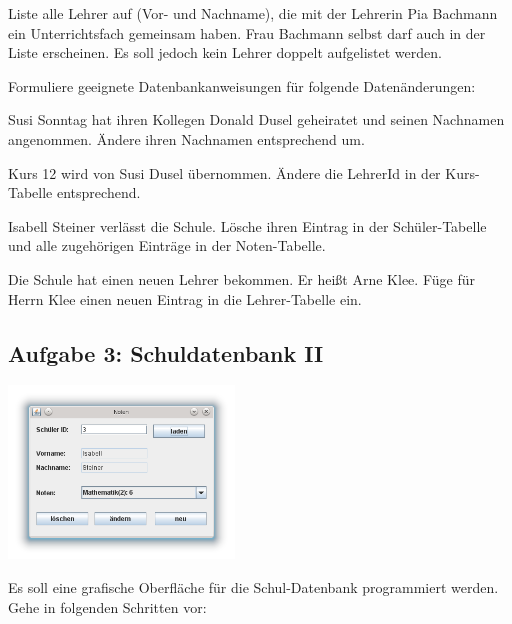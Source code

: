 \begin{compactenum}[a)]
\begin{compactenum}[1.]
\item Liste alle Lehrer auf (Vor- und Nachname), die mit der Lehrerin Pia
Bachmann ein Unterrichtsfach gemeinsam haben. Frau Bachmann selbst darf auch in
der Liste erscheinen. Es soll jedoch kein Lehrer doppelt aufgelistet werden.
\end{compactenum}

\item Formuliere geeignete Datenbankanweisungen für folgende Datenänderungen:

\begin{compactenum}[1.]
\item Susi Sonntag hat ihren Kollegen Donald Dusel geheiratet und seinen
Nachnamen angenommen. Ändere ihren Nachnamen entsprechend um.

\item Kurs 12 wird von Susi Dusel übernommen. Ändere die LehrerId in der
 Kurs-Tabelle entsprechend.

\item Isabell Steiner verlässt die Schule. Lösche ihren Eintrag in der
 Schüler-Tabelle und alle zugehörigen Einträge in der Noten-Tabelle.

\item Die Schule hat einen neuen Lehrer bekommen. Er heißt Arne Klee. Füge für
Herrn Klee einen neuen Eintrag in die Lehrer-Tabelle ein.
\end{compactenum}
\end{compactenum}


\subsection{Aufgabe 3: Schuldatenbank II}

\begin{center}
\includegraphics[width=0.45\textwidth]{./inf/SEKII/44_Abi-Training/Noten.png}
\end{center}

Es soll eine grafische Oberfläche für die Schul-Datenbank programmiert werden. Gehe in folgenden Schritten vor:

